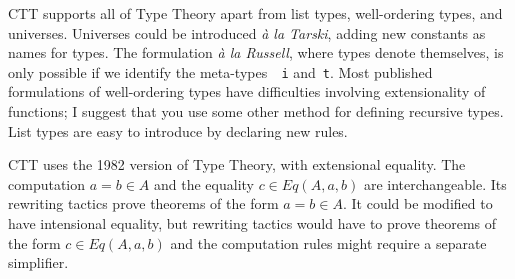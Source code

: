 CTT supports all of Type Theory apart from list types, well-ordering types,
and universes.  Universes could be introduced {\em\`a la Tarski}, adding new
constants as names for types.  The formulation {\em\`a la Russell}, where
types denote themselves, is only possible if we identify the meta-types~{\tt
  i} and~{\tt t}.  Most published formulations of well-ordering types have
difficulties involving extensionality of functions; I suggest that you use
some other method for defining recursive types.  List types are easy to
introduce by declaring new rules.

CTT uses the 1982 version of Type Theory, with extensional equality.  The
computation $a=b\in A$ and the equality $c\in Eq(A,a,b)$ are interchangeable.
Its rewriting tactics prove theorems of the form $a=b\in A$.  It could be
modified to have intensional equality, but rewriting tactics would have to
prove theorems of the form $c\in Eq(A,a,b)$ and the computation rules might
require a separate simplifier.


